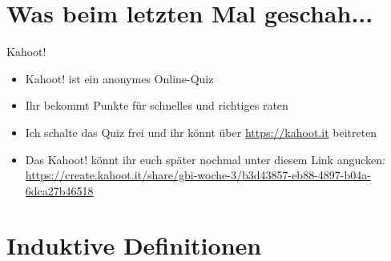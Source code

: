 \section{Was beim letzten Mal geschah...}

\framePrevEpisode

\begin{frame}{Kahoot!}
	\begin{itemize}[<+->]
		\item Kahoot! ist ein anonymes Online-Quiz
		\item Ihr bekommt Punkte für schnelles und richtiges raten
		\item Ich schalte das Quiz frei und ihr könnt über \url{https://kahoot.it} beitreten
		\item Das Kahoot! könnt ihr euch später nochmal unter diesem Link angucken: \\
			\url{https://create.kahoot.it/share/gbi-woche-3/b3d43857-eb88-4897-b04a-6dca27b46518}
	\end{itemize}
\end{frame}






\section{Induktive Definitionen}

